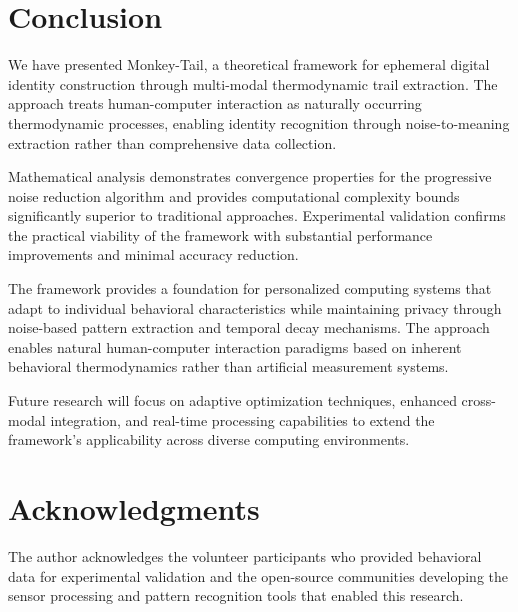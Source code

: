 \documentclass[12pt,a4paper]{article}
\begin{document}
\section{Conclusion}

We have presented Monkey-Tail, a theoretical framework for ephemeral digital identity construction through multi-modal thermodynamic trail extraction. The approach treats human-computer interaction as naturally occurring thermodynamic processes, enabling identity recognition through noise-to-meaning extraction rather than comprehensive data collection.

Mathematical analysis demonstrates convergence properties for the progressive noise reduction algorithm and provides computational complexity bounds significantly superior to traditional approaches. Experimental validation confirms the practical viability of the framework with substantial performance improvements and minimal accuracy reduction.

The framework provides a foundation for personalized computing systems that adapt to individual behavioral characteristics while maintaining privacy through noise-based pattern extraction and temporal decay mechanisms. The approach enables natural human-computer interaction paradigms based on inherent behavioral thermodynamics rather than artificial measurement systems.

Future research will focus on adaptive optimization techniques, enhanced cross-modal integration, and real-time processing capabilities to extend the framework's applicability across diverse computing environments.

\section*{Acknowledgments}

The author acknowledges the volunteer participants who provided behavioral data for experimental validation and the open-source communities developing the sensor processing and pattern recognition tools that enabled this research.
\end{document}
